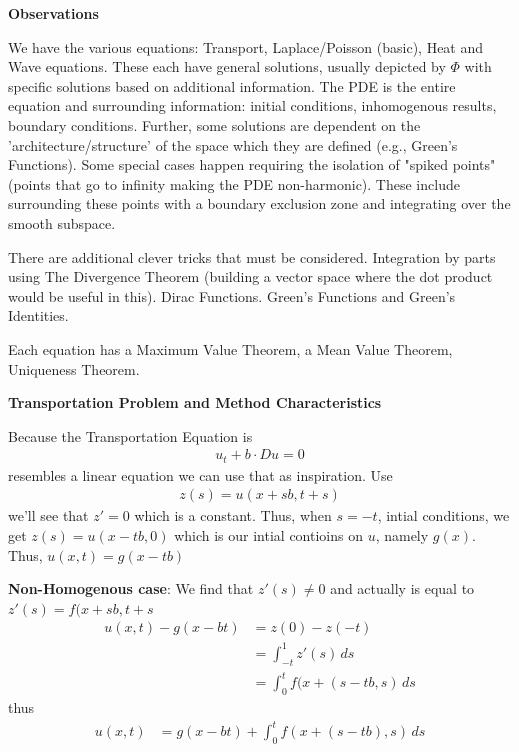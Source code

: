 \documentclass[12pt,a4paper]{report}
\begin{document}
\HLINE
\begin{description}
	\item \textbf{Observations}
	
	We have the various equations: Transport, Laplace/Poisson (basic), Heat and Wave equations.  These each have general solutions, usually depicted by $\Phi$ with specific solutions based on additional information.  The PDE is the entire equation and surrounding information: initial conditions, inhomogenous results, boundary conditions.  Further, some solutions are dependent on the 'architecture/structure' of the space which they are defined (e.g., Green's Functions).  Some special cases happen requiring the isolation of "spiked points" (points that go to infinity making the PDE non-harmonic).  These include surrounding these points with a boundary exclusion zone and integrating over the smooth subspace.
	
	There are additional clever tricks that must be considered.  Integration by parts using The Divergence Theorem (building a vector space where the dot product would be useful in this).  Dirac Functions.  Green's Functions and Green's Identities.
	
	Each equation has a Maximum Value Theorem, a Mean Value Theorem, Uniqueness Theorem.

	\item \textbf{Transportation Problem and Method Characteristics}
	
	Because the Transportation Equation is
	\begin{align*}
		u_t+b\cdot Du=0
	\end{align*}resembles a linear equation we can use that as inspiration.  Use
	\begin{align*}
		z(s) = u(x+sb, t+s)
	\end{align*}we'll see that $z' = 0$ which is a constant.  Thus, when $s=-t$, intial conditions, we get $z(s) = u(x-tb, 0)$ which is our intial contioins on $u$, namely $g(x)$.  Thus, $u(x,t) = g(x-tb)$
	
	\textbf{Non-Homogenous case}: We find that $z'(s) \ne 0$ and actually is equal to $z'(s) = f(x+sb, t+s$
	\begin{align*}
		u(x,t)-g(x-bt) &= z(0)-z(-t)\\
		&= \int_{-t}^1 z'(s)\, ds \\
		&= \int_0^t f(x+(s-tb,s)\,ds
	\end{align*}thus
	\begin{align*}
		u(x,t) &= g(x-bt) +\int_0^t f(x+(s-tb),s)\,ds
	\end{align*}
	

\end{description}
\end{document}
